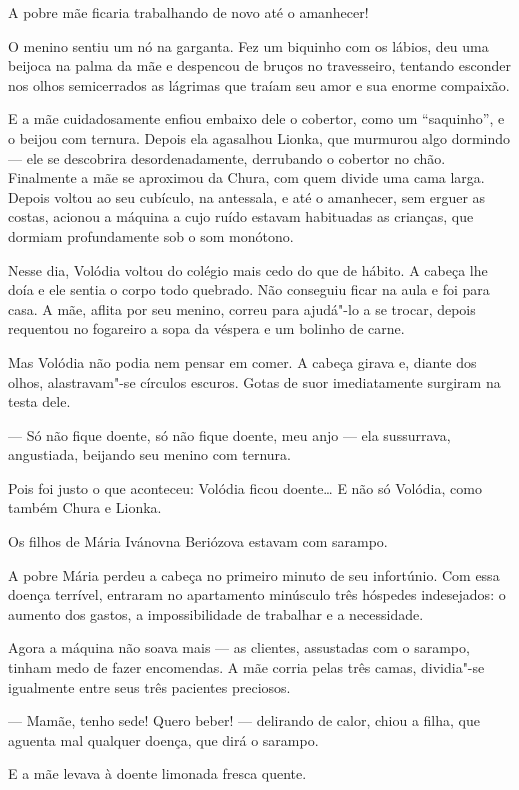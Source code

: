 A pobre mãe ficaria trabalhando de novo até o amanhecer!

O menino sentiu um nó na garganta. Fez um biquinho com os lábios, deu
uma beijoca na palma da mãe e despencou de bruços no travesseiro,
tentando esconder nos olhos semicerrados as lágrimas que traíam seu amor
e sua enorme compaixão.

E a mãe cuidadosamente enfiou embaixo dele o cobertor, como um
``saquinho'', e o beijou com ternura. Depois ela agasalhou Lionka, que
murmurou algo dormindo --- ele se descobrira desordenadamente, derrubando o cobertor no chão. Finalmente a mãe se aproximou da Chura,
com quem divide uma cama larga. Depois voltou ao seu cubículo, na
antessala, e até o amanhecer, sem erguer as costas, acionou a máquina a
cujo ruído estavam habituadas as crianças, que dormiam profundamente sob
o som monótono.

\asterisc

Nesse dia, Volódia voltou do colégio mais cedo do que de hábito. A cabeça
lhe doía e ele sentia o corpo todo quebrado. Não conseguiu ficar na
aula e foi para casa. A mãe, aflita por seu menino, correu para ajudá"-lo
a se trocar, depois requentou no fogareiro a sopa da véspera e um
bolinho de carne.

Mas Volódia não podia nem pensar em comer. A cabeça girava e, diante dos
olhos, alastravam"-se círculos escuros. Gotas de suor imediatamente
surgiram na testa dele.

--- Só não fique doente, só não fique doente, meu anjo --- ela
sussurrava, angustiada, beijando seu menino com ternura.

Pois foi justo o que aconteceu: Volódia ficou doente\ldots{} E não só
Volódia, como também Chura e Lionka.

Os filhos de Mária Ivánovna Beriózova estavam com sarampo.

A pobre Mária perdeu a cabeça no primeiro minuto de seu
infortúnio. Com essa doença terrível, entraram no apartamento minúsculo
três hóspedes indesejados: o aumento dos gastos, a impossibilidade de
trabalhar e a necessidade.

Agora a máquina não soava mais --- as clientes, assustadas com o
sarampo, tinham medo de fazer encomendas. A mãe corria pelas três camas,
dividia"-se igualmente entre seus três pacientes preciosos.

--- Mamãe, tenho sede! Quero beber! --- delirando de calor, chiou a filha,
que aguenta mal qualquer doença, que dirá o sarampo.

E a mãe levava à doente limonada fresca quente.


